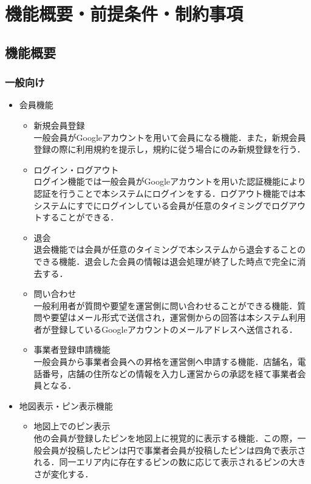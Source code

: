 \section{機能概要・前提条件・制約事項}
\subsection{機能概要}
\subsubsection{一般向け}
\begin{itemize}[itemsep=10pt]
    \item 会員機能
    \begin{itemize}[itemsep=10pt]
        \item 新規会員登録 \mbox{}\\
        一般会員がGoogleアカウントを用いて会員になる機能．また，新規会員登録の際に利用規約を提示し，規約に従う場合にのみ新規登録を行う．
        \item ログイン・ログアウト \mbox{}\\
        ログイン機能では一般会員がGoogleアカウントを用いた認証機能により認証を行うことで本システムにログインをする．ログアウト機能では本システムにすでにログインしている会員が任意のタイミングでログアウトすることができる．
        \item 退会 \mbox{}\\
        退会機能では会員が任意のタイミングで本システムから退会することのできる機能．退会した会員の情報は退会処理が終了した時点で完全に消去する．
        \item 問い合わせ \mbox{}\\
        一般利用者が質問や要望を運営側に問い合わせることができる機能．質問や要望はメール形式で送信され，運営側からの回答は本システム利用者が登録しているGoogleアカウントのメールアドレスへ送信される．
        \item 事業者登録申請機能 \mbox{}\\
        一般会員から事業者会員への昇格を運営側へ申請する機能．店舗名，電話番号，店舗の住所などの情報を入力し運営からの承認を経て事業者会員となる．
    \end{itemize}
    \item 地図表示・ピン表示機能
    \begin{itemize}[itemsep=10pt]
        \item 地図上でのピン表示 \mbox{}\\
        他の会員が登録したピンを地図上に視覚的に表示する機能．この際，一般会員が投稿したピンは円で事業者会員が投稿したピンは四角で表示される．同一エリア内に存在するピンの数に応じて表示されるピンの大きさが変化する．

\end{itemize}
\end{itemize}
